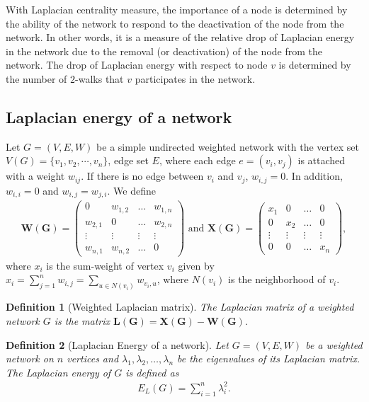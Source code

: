 \documentclass[10pt,a4paper]{article}
\newtheorem{defn}{Definition}
\begin{document}
With Laplacian centrality measure, the importance of a node is determined by the ability of the network to respond to the deactivation  of the node from the network. In other words, it is a measure of the relative drop of Laplacian energy in the network due to the removal (or deactivation) of the node from the network. The drop of Laplacian energy with respect to node $v$ is determined by the number of $2$-walks that $v$ participates in the network. 

\subsection{Laplacian energy of a network}
Let $G = (V,E,W)$ be a simple undirected weighted network with the vertex set $V(G) = \{v_1,v_2,\cdots, v_n\}$, edge set $E$, where each edge $e=(v_i,v_j)$ is attached with a weight $w_{ij}$. If there is no edge between $v_i$ and $v_j$, $w_{i,j}=0$. In addition, $w_{i,i} =0$ and $w_{i,j} = w_{j,i}$. We define 
\begin{eqnarray*}
	\mathbf{W(G)} = \begin{pmatrix}
		0 & w_{1,2} & \ldots  & w_{1,n} \\
		w_{2,1} & 0 & \ldots & w_{2,n} \\
		\vdots   & \vdots & \vdots & \vdots \\
		w_{n,1} & w_{n,2} & \ldots & 0 
	\end{pmatrix} \text{ and }
	\mathbf{X(G)} = \begin{pmatrix}
		x_1 & 0 & \ldots  & 0 \\
		0 & x_2 & \ldots & 0 \\
		\vdots   &\vdots & \vdots & \vdots \\
		0 & 0 & \ldots & x_n
	\end{pmatrix} ,
\end{eqnarray*}
where $x_i$ is the sum-weight of vertex $v_i$ given by $x_i = \sum_{j=1}^n w_{i,j} = \sum_{u \in N(v_i)} w_{v_i,u}$, where $N(v_i)$ is the neighborhood of $v_i$.
\begin{defn}[Weighted Laplacian matrix]
	The Laplacian matrix of a weighted network $G$ is the matrix $\mathbf{L(G)} = \mathbf{X(G)} - \mathbf{W(G)}$. 
\end{defn}
\begin{defn}[Laplacian Energy of a network]
	Let $G=(V,E,W)$ be a weighted network on $n$ vertices and $\lambda_1,\lambda_2, \ldots,\lambda_n$ be the eigenvalues of its Laplacian matrix. The Laplacian energy of $G$ is defined as 
	\begin{eqnarray*}
		E_L(G) = \sum_{i=1}^n \lambda_i ^2 .
	\end{eqnarray*} 
\end{defn}
\end{document}
